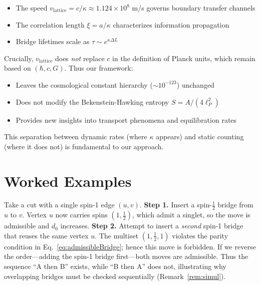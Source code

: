 \documentclass[11pt]{article}
\begin{document}
\begin{itemize}
  \item The speed $v_{\text{lattice}} = c/\kappa \approx 1.124 \times 10^8$ m/s governs boundary transfer channels
  \item The correlation length $\xi = a/\kappa$ characterizes information propagation
  \item Bridge lifetimes scale as $\tau \sim e^{\kappa\Delta L}$
\end{itemize}

Crucially, $v_{\text{lattice}}$ does \emph{not} replace $c$ in the definition of Planck units, which remain based on $(\hbar, c, G)$. Thus our framework:
\begin{itemize}
  \item Leaves the cosmological constant hierarchy ($\sim 10^{-123}$) unchanged
  \item Does not modify the Bekenstein-Hawking entropy $S = A/(4\ell_P^2)$
  \item Provides new insights into transport phenomena and equilibration rates
\end{itemize}

This separation between dynamic rates (where $\kappa$ appears) and static counting (where it does not) is fundamental to our approach.


\section{Worked Examples}

\begin{example}\label{ex:overlap}
  Take a cut with a single spin-1 edge $(u,v)$.
  \textbf{Step 1.} Insert a spin-$\tfrac12$ bridge from $u$ to $v$.
  Vertex $u$ now carries spins $(1,\tfrac12)$, which admit a singlet, so the move is admissible and $d_0$ increases.
  \textbf{Step 2.} Attempt to insert a \emph{second} spin-1 bridge that reuses the same vertex $u$.
  The multiset $(1,\tfrac12,1)$ violates the parity condition in Eq.~\eqref{eq:admissibleBridge}; hence this move is forbidden.
  If we reverse the order—adding the spin-1 bridge first—both moves are admissible.
  Thus the sequence “A then B” exists, while “B then A” does not, illustrating why overlapping bridges must be checked sequentially (Remark~\ref{rem:simul}).

\end{example}
\end{document}
